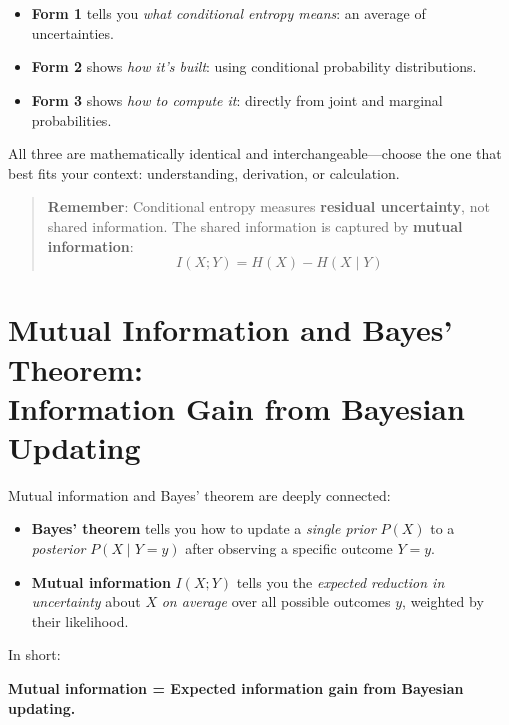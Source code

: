 \documentclass[11pt]{article}
\begin{document}
\section*{\texorpdfstring{\faComment}{Interpretation Summary}}

\begin{itemize}
    \item \textbf{Form 1} tells you \textit{what conditional entropy means}: an average of uncertainties.
    \item \textbf{Form 2} shows \textit{how it’s built}: using conditional probability distributions.
    \item \textbf{Form 3} shows \textit{how to compute it}: directly from joint and marginal probabilities.
\end{itemize}

All three are mathematically identical and interchangeable—choose the one that best fits your context: understanding, derivation, or calculation.

\begin{quote}
\textbf{Remember}: Conditional entropy measures \textbf{residual uncertainty}, not shared information. The shared information is captured by \textbf{mutual information}:
\[
I(X;Y) = H(X) - H(X \mid Y)
\]
\end{quote}




\section*{Mutual Information and Bayes' Theorem: \\ Information Gain from Bayesian Updating}

Mutual information and Bayes' theorem are deeply connected:
\begin{itemize}
\item \textbf{Bayes' theorem} tells you how to update a \emph{single prior} \(P(X)\) to a \emph{posterior} \(P(X \mid Y = y)\) after observing a specific outcome \(Y = y\).
    \item \textbf{Mutual information} \(I(X;Y)\) tells you the \emph{expected reduction in uncertainty} about \(X\) \emph{on average} over all possible outcomes \(y\), weighted by their likelihood.
\end{itemize}


In short:
\begin{center}
    \textbf{Mutual information = Expected information gain from Bayesian updating.}
\end{center}
\end{document}
